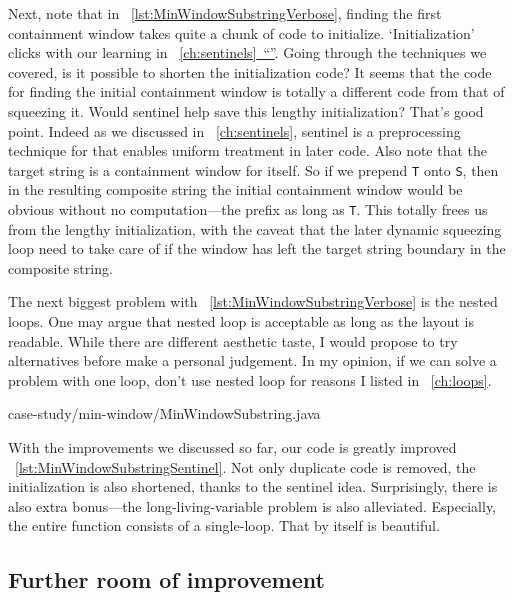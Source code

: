 \documentclass[oneside,11pt]{book}
\theoremstyle{definition}
\theoremstyle{remark}
\newcommand{\code}[1]{\mbox{\lstinline{#1}}}
\newcommand*{\fullref}[1]{\hyperref[{#1}]{\mbox{\autoref*{#1}~}``\nameref*{#1}''}}
\begin{document}
Next, note that in ~\autoref{lst:MinWindowSubstringVerbose}, finding the first containment
window takes quite a chunk of code to initialize.
`Initialization' clicks with our learning in ~\fullref{ch:sentinels}.
Going through the techniques we covered, is it possible to shorten the initialization code?
It seems that the code for finding the initial containment window is totally a different code
from that of squeezing it.
Would sentinel help save this lengthy initialization?
That's good point.
Indeed as we discussed in ~\autoref{ch:sentinels}, sentinel is a preprocessing technique for
that enables uniform treatment in later code.
Also note that the target string is a containment window for itself.
So if we prepend \code{T} onto \code{S}, then in the resulting composite string the initial
containment window would be obvious without no computation---the prefix as long as \code{T}.
This totally frees us from the lengthy initialization, with the caveat that the later dynamic
squeezing loop need to take care of if the window has left the target string boundary in the
composite string.

The next biggest problem with ~\autoref{lst:MinWindowSubstringVerbose} is the nested loops.
One may argue that nested loop is acceptable as long as the layout is readable.
While there are different aesthetic taste, I would propose to try alternatives before make a
personal judgement.
In my opinion, if we can solve a problem with one loop, don't use nested loop for reasons I
listed in ~\autoref{ch:loops}.


{case-study/min-window/MinWindowSubstring.java}

With the improvements we discussed so far, our code is greatly improved
~\autoref{lst:MinWindowSubstringSentinel}.
Not only duplicate code is removed, the initialization is also shortened, thanks to
the sentinel idea.
Surprisingly, there is also extra bonus---the long-living-variable problem is also alleviated.
Especially, the entire function consists of a single-loop.
That by itself is beautiful.

\subsection{Further room of improvement}
\end{document}
